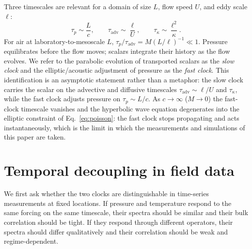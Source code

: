 \documentclass[11pt]{article}
\begin{document}
Three timescales are relevant for a domain of size $L$, flow speed $U$, and eddy
scale $\ell$:
\begin{equation}
\tau_p \sim \frac{L}{c}, \qquad
\tau_{\mathrm{adv}} \sim \frac{\ell}{U}, \qquad
\tau_\kappa \sim \frac{\ell^2}{\kappa}.
\label{eq:timescales}
\end{equation}
For air at laboratory-to-mesoscale $L$,
$\tau_p/\tau_{\mathrm{adv}} = M(L/\ell)^{-1} \ll 1$. Pressure equilibrates before
the flow moves; scalars integrate their history as the flow evolves. We refer to
the parabolic evolution of transported scalars as the \emph{slow clock} and the
elliptic/acoustic adjustment of pressure as the \emph{fast clock}. This
identification is an asymptotic statement rather than a metaphor: the slow clock
carries the scalar on the advective and diffusive timescales
$\tau_{\mathrm{adv}} \sim \ell/U$ and $\tau_\kappa$, while the fast clock
adjusts pressure on $\tau_p \sim L/c$. As $c \to \infty$ ($M \to 0$) the
fast-clock timescale vanishes and the hyperbolic wave equation degenerates into
the elliptic constraint of Eq.~\eqref{eq:poisson}: the fast clock stops
propagating and acts instantaneously, which is the limit in which the
measurements and simulations of this paper are taken.


\section{Temporal decoupling in field data}
\label{sec:temporal}

We first ask whether the two clocks are distinguishable in time-series
measurements at fixed locations. If pressure and temperature respond to the same
forcing on the same timescale, their spectra should be similar and their bulk
correlation should be tight. If they respond through different operators, their
spectra should differ qualitatively and their correlation should be weak and
regime-dependent.
\end{document}
